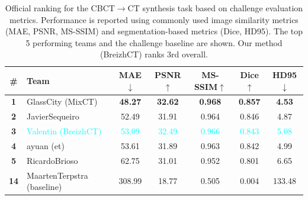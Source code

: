 \documentclass[lettersize,journal]{IEEEtran}
\begin{document}
\begin{table}[h!]
\centering
\scriptsize
\renewcommand{\arraystretch}{1}
\setlength{\tabcolsep}{5pt}
\caption{
Official ranking for the CBCT$\rightarrow$CT synthesis task based on challenge evaluation metrics. Performance is reported using commonly used image similarity metrics (MAE, PSNR, MS-SSIM) and segmentation-based metrics (Dice, HD95). The top 5 performing teams and the challenge baseline are shown. Our method (BreizhCT) ranks 3rd overall.
}
\label{tab:cbctct_image}
\begin{tabular}{clccccc}
\toprule
\textbf{\#} & \textbf{Team} & \textbf{MAE$\downarrow$} & \textbf{PSNR$\uparrow$} & \textbf{MS-SSIM$\uparrow$} & \textbf{Dice$\uparrow$} & \textbf{HD95$\downarrow$} \\
\midrule
\textbf{1} & GlassCity (MixCT)         & \textbf{48.27}  & \textbf{32.62} & \textbf{0.968} & \textbf{0.857} & \textbf{4.53} \\
\textbf{2} & JavierSequeiro            & 52.49  & 31.91 & 0.964 & 0.846 & 4.87 \\
\textbf{3} & \textcolor{cyan}{Valentin (BreizhCT)} 
& \textcolor{cyan}{53.09}  & \textcolor{cyan}{32.49} & \textcolor{cyan}{0.966} & \textcolor{cyan}{0.843} & \textcolor{cyan}{5.08} \\
\textbf{4} & ayuan (et)                & 53.61  & 31.89 & 0.963 & 0.842 & 4.99 \\
\textbf{5} & RicardoBrioso             & 62.75  & 31.01 & 0.952 & 0.801 & 6.65 \\
\midrule
\textbf{14} & MaartenTerpstra (baseline) & 308.99 & 18.77 & 0.505 & 0.004 & 133.48 \\
\bottomrule
\end{tabular}

\end{table}
\end{document}
